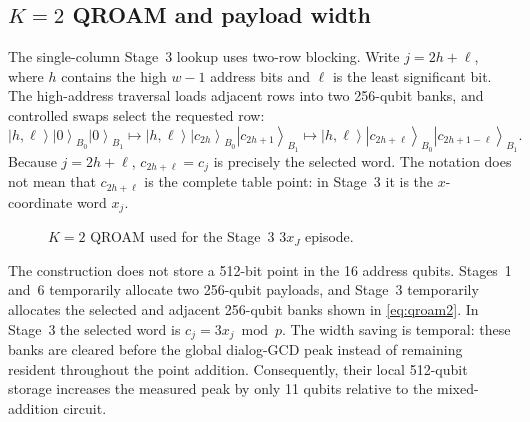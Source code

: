 \documentclass[10pt]{article}
\newcommand{\ket}[1]{\left\lvert #1\right\rangle}
\begin{document}
\subsection{$K=2$ QROAM and payload width}

The single-column Stage~3 lookup uses two-row blocking. Write $j=2h+\ell$, where $h$ contains the high $w-1$ address bits and $\ell$ is the least significant bit. The high-address traversal loads adjacent rows into two 256-qubit banks, and controlled swaps select the requested row:
\begin{equation}
\ket{h,\ell}\ket{0}_{B_0}\ket{0}_{B_1}\longmapsto\ket{h,\ell}\ket{c_{2h}}_{B_0}\ket{c_{2h+1}}_{B_1}\longmapsto\ket{h,\ell}\ket{c_{2h+\ell}}_{B_0}\ket{c_{2h+1-\ell}}_{B_1}.
\label{eq:qroam2}
\end{equation}
Because $j=2h+\ell$, $c_{2h+\ell}=c_j$ is precisely the selected word. The notation does not mean that $c_{2h+\ell}$ is the complete table point: in Stage~3 it is the $x$-coordinate word $x_j$.

\begin{figure}[ht]
\centering
{}
\caption{$K=2$ QROAM used for the Stage~3 $3x_J$ episode.}
\label{fig:qroam2}
\end{figure}

The construction does not store a 512-bit point in the 16 address qubits. Stages~1 and~6 temporarily allocate two 256-qubit payloads, and Stage~3 temporarily allocates the selected and adjacent 256-qubit banks shown in \eqref{eq:qroam2}. In Stage~3 the selected word is $c_j=3x_j\bmod p$. The width saving is temporal: these banks are cleared before the global dialog-GCD peak instead of remaining resident throughout the point addition. Consequently, their local 512-qubit storage increases the measured peak by only 11 qubits relative to the mixed-addition circuit.
\end{document}
